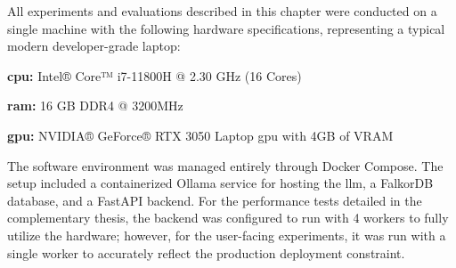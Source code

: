 All experiments and evaluations described in this chapter were conducted on a single machine with the following hardware specifications, representing a typical modern developer-grade laptop:

\begin{compactitem}[\textbullet]
    \item \textbf{\acs{cpu}:} Intel® Core™ i7-11800H @ 2.30 GHz (16 Cores)
    \item \textbf{\acs{ram}:} 16 GB DDR4 @ 3200MHz
    \item \textbf{\acs{gpu}:} NVIDIA® GeForce® RTX 3050 Laptop \acs{gpu} with 4GB of VRAM
\end{compactitem}

The software environment was managed entirely through Docker Compose. The setup included a containerized Ollama service for hosting the \ac{llm}, a FalkorDB database, and a FastAPI backend. For the performance tests detailed in the complementary thesis, %
the backend was configured to run with 4 workers to fully utilize the hardware; however, for the 
user-facing experiments, %
it was run with a single worker to accurately reflect the production deployment constraint.